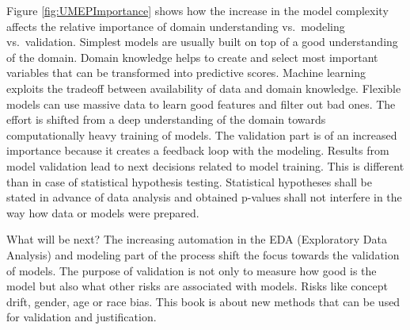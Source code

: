 \documentclass[12pt,]{krantz}
\begin{document}
Figure \ref{fig:UMEPImportance} shows how the increase in the model complexity affects the relative importance of domain understanding vs.~modeling vs.~validation. Simplest models are usually built on top of a good understanding of the domain. Domain knowledge helps to create and select most important variables that can be transformed into predictive scores. Machine learning exploits the tradeoff between availability of data and domain knowledge. Flexible models can use massive data to learn good features and filter out bad ones. The effort is shifted from a deep understanding of the domain towards computationally heavy training of models. The validation part is of an increased importance because it creates a feedback loop with the modeling. Results from model validation lead to next decisions related to model training. This is different than in case of statistical hypothesis testing. Statistical hypotheses shall be stated in advance of data analysis and obtained p-values shall not interfere in the way how data or models were prepared.

What will be next? The increasing automation in the EDA (Exploratory Data Analysis) and modeling part of the process shift the focus towards the validation of models. The purpose of validation is not only to measure how good is the model but also what other risks are associated with models. Risks like concept drift, gender, age or race bias. This book is about new methods that can be used for validation and justification.
\end{document}
